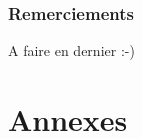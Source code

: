 \documentclass[a4paper,11pt,twoside]{StyleThese}
\begin{document}



\setcounter{page}{0}
\cleardoublepage

\section*{Remerciements}

A faire en dernier :-)

\dominitoc
\tableofcontents



\mainmatter



\appendix

\cleardoublepage
\mtcaddpart[Annexes]
\part*{Annexes}






\end{document}
